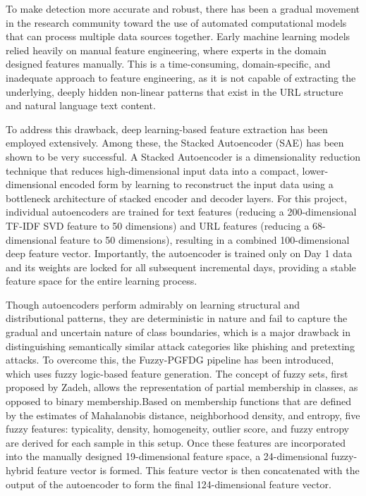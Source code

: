 To make detection more accurate and robust, there has been a gradual movement in the research community toward the use of automated computational models that can process multiple data sources together. Early machine learning models relied heavily on manual feature engineering, where experts in the domain designed features manually. This is a time-consuming, domain-specific, and inadequate approach to feature engineering, as it is not capable of extracting the underlying, deeply hidden non-linear patterns that exist in the URL structure and natural language text content.

To address this drawback, deep learning-based feature extraction has been employed extensively. Among these, the Stacked Autoencoder (SAE) has been shown to be very successful. A Stacked Autoencoder is a dimensionality reduction technique that reduces high-dimensional input data into a compact, lower-dimensional encoded form by learning to reconstruct the input data using a bottleneck architecture of stacked encoder and decoder layers. For this project, individual autoencoders are trained for text features (reducing a 200-dimensional TF-IDF SVD feature to 50 dimensions) and URL features (reducing a 68-dimensional feature to 50 dimensions), resulting in a combined 100-dimensional deep feature vector. Importantly, the autoencoder is trained only on Day 1 data and its weights are locked for all subsequent incremental days, providing a stable feature space for the entire learning process.

Though autoencoders perform admirably on learning structural and distributional patterns, they are deterministic in nature and fail to capture the gradual and uncertain nature of class boundaries, which is a major drawback in distinguishing semantically similar attack categories like phishing and pretexting attacks. To overcome this, the Fuzzy-PGFDG pipeline has been introduced, which uses fuzzy logic-based feature generation. The concept of fuzzy sets, first proposed by Zadeh, allows the representation of partial membership in classes, as opposed to binary membership.Based on membership functions that are defined by the estimates of Mahalanobis distance, neighborhood density, and entropy, five fuzzy features: typicality, density, homogeneity, outlier score, and fuzzy entropy are derived for each sample in this setup. Once these features are incorporated into the manually designed 19-dimensional feature space, a 24-dimensional fuzzy-hybrid feature vector is formed. This feature vector is then concatenated with the output of the autoencoder to form the final 124-dimensional feature vector.

